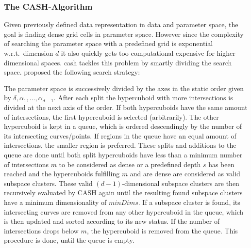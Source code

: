\subsubsection*{The CASH-Algorithm}
Given previously defined data representation in data and parameter space, the goal is finding dense grid cells in parameter space. However since the complexity of searching the parameter space with a predefined grid is exponential w.r.t.\ dimension $d$ it also quickly gets too computational expensive for higher dimensional spaces. \gls{cash} tackles this problem by smartly dividing the search space. \citeauthor{CASHachtert2008robust} proposed the following search strategy:
\vspace{5mm}

The parameter space is successively divided by the axes in the static order given by $\delta,\alpha_1,\dotsc,\alpha_{d-1}$. After each split the hypercuboid with more intersections is divided at the next axis of the order. If both hypercuboids have the same amount of intersections, the first hypercuboid is selected (arbitrarily). The other hypercuboid is kept in a queue, which is ordered descendingly by the number of its intersecting curves/points. If regions in the queue have an equal amount of intersections, the smaller region is preferred. These splits and additions to the queue are done until both split hypercuboids have less than a minimum number of intersections $m$ to be considered as dense or a predefined depth $s$ has been reached and the hypercuboids fulfilling $m$ and are dense are considered as valid subspace clusters. These valid $(d-1)$-dimensional subspace clusters are then recursively evaluated by CASH again until the resulting found subspace clusters have a minimum dimensionality of $minDims$. If a subspace cluster is found, its intersecting curves are removed from any other hypercuboid in the queue, which is then updated and sorted according to its new status. If the number of intersections drops below $m$, the hypercuboid is removed from the queue. This procedure is done, until the queue is empty.

